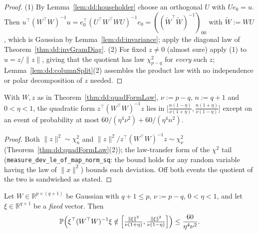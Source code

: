 \begin{proof}
  \leanok
(1) By Lemma~\ref{lem:dd:householder} choose an orthogonal $U$ with $Ue_0=u$. Then $u^\top(W^\top W)^{-1}u=e_0^\top(U^\top W^\top WU)^{-1}e_0=((\tilde W^\top\tilde W)^{-1})_{00}$ with $\tilde W:=WU$, which is Gaussian
by Lemma~\ref{lem:dd:invariance}; apply the diagonal law of Theorem~\ref{thm:dd:invGramDiag}. (2) For fixed $z\neq0$ (almost sure) apply (1) to $u=z/\|z\|$, giving that the quotient has law $\chi^2_{p-q}$ for \emph{every} such $z$; Lemma~\ref{lem:dd:columnSplit}(2)
assembles the product law with no independence or polar decomposition of $z$ needed.
\end{proof}

\begin{theorem}\label{thm:dd:quadFormConc}
  \leanok
With $W,z$ as in Theorem~\ref{thm:dd:quadFormLaw}, $\nu:=p-q$, $n:=q+1$ and $0<\eta<1$, the quadratic form $z^\top(W^\top W)^{-1}z$ lies in
$\bigl[\tfrac{n(1-\eta)}{\nu(1+\eta)},\tfrac{n(1+\eta)}{\nu(1-\eta)}\bigr]$ except on an event of probability at most $60/(\eta^4\nu^2)+60/(\eta^4n^2)$.
\end{theorem}

\begin{proof}
  \leanok
Both $\|z\|^2\sim\chi^2_n$ and $\|z\|^2/z^\top(W^\top W)^{-1}z\sim\chi^2_\nu$ (Theorem~\ref{thm:dd:quadFormLaw}(2)); the law-transfer form of the $\chi^2$ tail
(\texttt{measure\_dev\_le\_of\_map\_norm\_sq}: the bound holds for any random variable having the law of $\|x\|^2$) bounds each deviation. Off both events the quotient of the two is sandwiched as stated.
\end{proof}

\begin{theorem}\label{thm:dd:quadFormFixed}
  \leanok
Let $W\in\mathbb R^{p\times(q+1)}$ be Gaussian with $q+1\le p$, $\nu:=p-q$, $0<\eta<1$, and let $\xi\in\mathbb R^{q+1}$ be a \emph{fixed} vector. Then
\[
  \mathbb P\Bigl(\xi^\top(W^\top W)^{-1}\xi\notin\Bigl[\tfrac{\|\xi\|^2}{\nu(1+\eta)},\tfrac{\|\xi\|^2}{\nu(1-\eta)}\Bigr]\Bigr)\le\frac{60}{\eta^4\nu^2}.
\]
\end{theorem}

